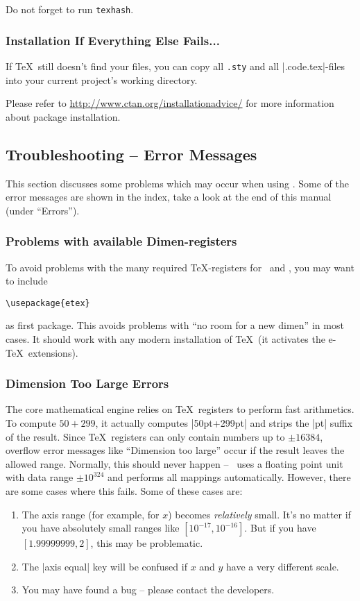 Do not forget to run \lstinline!texhash!.

\subsubsection{Installation If Everything Else Fails...}
If \TeX\ still doesn't find your files, you can copy all \lstinline!.sty! and all |.code.tex|-files into your current project's working directory.

Please refer to \url{http://www.ctan.org/installationadvice/} for more information about package installation.



\subsection{Troubleshooting -- Error Messages}
This section discusses some problems which may occur when using \PGFPlots.
Some of the error messages are shown in the index, take a look at the end of this manual (under ``Errors'').


\subsubsection{Problems with available Dimen-registers}
To avoid problems with the many required \TeX-registers for \PGF\ and \PGFPlots, you may want to include
\begin{verbatim}
\usepackage{etex}
\end{verbatim}
as first package. This avoids problems with ``no room for a new dimen''
%
in most cases. It should work with any modern installation of \TeX\ (it activates the e-\TeX\ extensions).

\subsubsection{Dimension Too Large Errors}
The core mathematical engine relies on \TeX\ registers to perform fast arithmetics. To compute $50+299$, it actually computes |50pt+299pt| and strips the |pt| suffix of the result. Since \TeX\ registers can only contain numbers up to $\pm 16384$, overflow error messages like ``Dimension too large'' occur if the result leaves the allowed range. Normally, this should never happen -- \PGFPlots\ uses a floating point unit with data range $\pm 10^{324}$ and performs all mappings automatically. However, there are some cases where this fails. Some of these cases are:
\begin{enumerate}
	\item The axis range (for example, for $x$) becomes \emph{relatively} small. It's no matter if you have absolutely small ranges like $[10^{-17},10^{-16}]$. But if you have $[1.99999999,2]$, this may be problematic.
	\item The |axis equal| key will be confused if $x$ and $y$ have a very different scale.
	\item You may have found a bug -- please contact the developers.
\end{enumerate}

